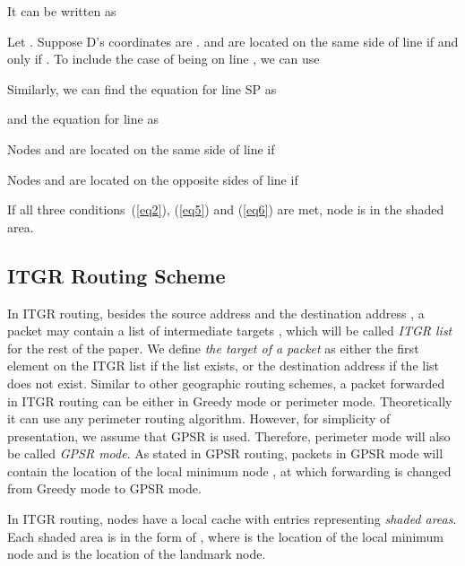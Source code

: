 \documentclass[3p,times]{elsarticle}
\begin{document}
It can be written as


Let .
Suppose D's coordinates are .
 and  are located on the same side of line  if and only if
. To include
the case of  being on line , we can use


Similarly, we can find the equation for line SP as


and the equation for line  as


Nodes  and  are located on the same side of line 
if


Nodes  and  are located on the opposite sides of line 
if


If all three conditions~(\ref{eq2}), (\ref{eq5}) and (\ref{eq6}) are met, node  is in the shaded area.




\subsection{ITGR Routing Scheme}

In ITGR routing,
besides the source address  and the destination address ,
a packet may contain
a list of intermediate targets ,
which will be called {\em ITGR list} for the rest of the paper.
We define {\em the target  of a packet} as either the first element on the
ITGR list if the list exists, or the destination address  if the list
does not exist.
Similar to other geographic routing schemes, a packet
forwarded in ITGR routing can be either in
Greedy mode or perimeter mode.
Theoretically it can
use any perimeter routing algorithm. However, for simplicity of
presentation, we assume that GPSR is used. Therefore, perimeter mode will also be
called {\em GPSR mode}.
As stated in GPSR routing, packets in GPSR mode will contain the location
of the local minimum node , at which forwarding is changed
from Greedy mode to GPSR mode.

In ITGR routing, nodes have a local cache with
entries representing {\em shaded areas}.
Each shaded area is in the form of
, where  is
the location of the local minimum node and 
is the location of the landmark node.
\end{document}
